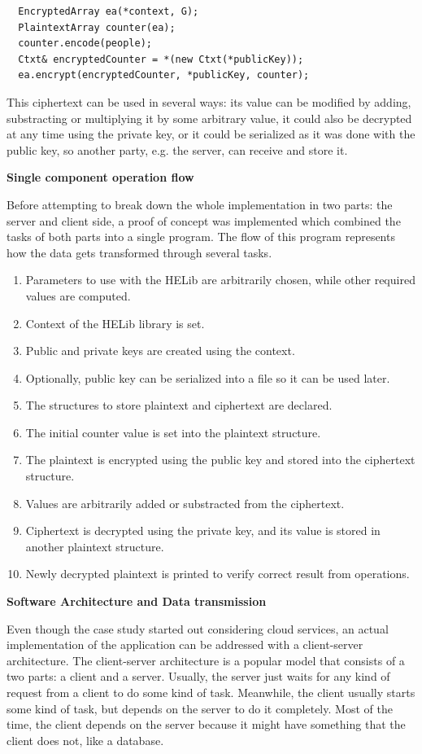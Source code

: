 \begin{lstlisting}
  EncryptedArray ea(*context, G);
  PlaintextArray counter(ea);  
  counter.encode(people);
  Ctxt& encryptedCounter = *(new Ctxt(*publicKey));  
  ea.encrypt(encryptedCounter, *publicKey, counter); 
\end{lstlisting}

This ciphertext can be used in several ways: its value can be modified by adding, substracting or multiplying it by some arbitrary value, it could also be decrypted at any time using the private key, or it could be serialized as it was done with the public key, so another party, e.g. the server, can receive and store it.

\textbf{Single component operation flow}

Before attempting to break down the whole implementation in two parts: the server and client side, a proof of concept was implemented which combined the tasks of both parts into a single program. The flow of this program represents how the data gets transformed through several tasks. 

\begin{enumerate}
	\item Parameters to use with the HELib are arbitrarily chosen, while other required values are computed.
	\item Context of the HELib library is set.	
	\item Public and private keys are created using the context.
	\item Optionally, public key can be serialized into a file so it can be used later.
	\item The structures to store plaintext and ciphertext are declared.
	\item The initial counter value is set into the plaintext structure.
	\item The plaintext is encrypted using the public key and stored into the ciphertext structure.
	\item Values are arbitrarily added or substracted from the ciphertext.
	\item Ciphertext is decrypted using the private key, and its value is stored in another plaintext structure.
	\item Newly decrypted plaintext is printed to verify correct result from operations.
\end{enumerate}

\textbf{Software Architecture and Data transmission}

Even though the case study started out considering cloud services, an actual implementation of the application can be addressed with a client-server architecture. The client-server architecture is a popular model that consists of a two parts: a client and a server. Usually, the server just waits for any kind of request from a client to do some kind of task. Meanwhile, the client usually starts some kind of task, but depends on the server to do it completely. Most of the time, the client depends on the server because it might have something that the client does not, like a database.

